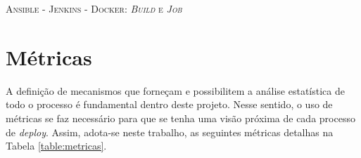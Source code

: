 \begin{algorithm}[H]
	\SetAlgoLined
	


	\caption{\textsc{Ansible - Jenkins - Docker: \textit{Build} e \textit{Job}}}
		\label{alg:algoritmo04}
\end{algorithm}



    \pagebreak[4]
\section{Métricas}

A definição de mecanismos que forneçam e possibilitem a análise estatística de todo o processo é fundamental dentro deste projeto. Nesse sentido, o uso de métricas se faz necessário para que se tenha uma visão próxima de cada processo de \textit{deploy}. Assim, adota-se neste trabalho, as seguintes métricas detalhas na Tabela \ref{table:metricas}.


